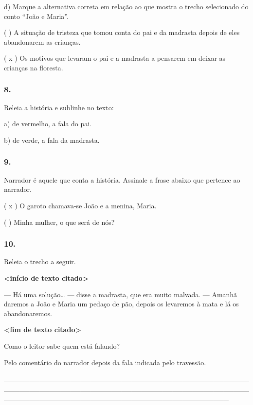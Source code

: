 d) Marque a alternativa correta em relação ao que mostra o trecho
selecionado do conto ``João e Maria''.

( ) A situação de tristeza que tomou conta do pai e da madrasta depois
de eles abandonarem as crianças.

( x ) Os motivos que levaram o pai e a madrasta a pensarem em deixar as
crianças na floresta.

\subsubsection{8. }\label{section-23}

Releia a história e sublinhe no texto:

a) de vermelho, a fala do pai.

b) de verde, a fala da madrasta.

\subsubsection{9. }\label{section-24}

Narrador é aquele que conta a história. Assinale a frase abaixo que
pertence ao narrador.

( x ) O garoto chamava-se João e a menina, Maria.

( ) Minha mulher, o que será de nós?

\subsubsection{10. }\label{section-25}

Releia o trecho a seguir.

\textbf{\textless{}início de texto citado\textgreater{}}

--- Há uma solução\ldots{} --- disse a madrasta, que era muito malvada.
--- Amanhã daremos a João e Maria um pedaço de pão, depois os levaremos
à mata e lá os abandonaremos.

\textbf{\textless{}fim de texto citado\textgreater{}}

Como o leitor sabe quem está falando?

Pelo comentário do narrador depois da fala indicada pelo travessão.

\_\_\_\_\_\_\_\_\_\_\_\_\_\_\_\_\_\_\_\_\_\_\_\_\_\_\_\_\_\_\_\_\_\_\_\_\_\_\_\_\_\_\_\_\_\_\_\_\_\_\_\_\_\_\_\_\_\_\_\_\_\_\_\_\_\_\_\_\_\_\_\_\_\_\_\_\_\_\_\_\_\_\_\_\_\_\_\_\_\_\_\_\_\_\_\_\_\_\_\_\_\_\_\_\_\_\_\_\_\_\_\_\_\_\_\_\_\_\_\_\_\_\_\_\_\_\_\_\_\_\_\_\_\_\_\_\_\_\_\_

